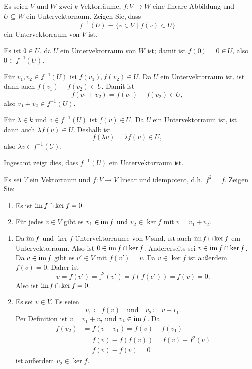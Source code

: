 \begin{question}
 Es seien $V$ und $W$ zwei $k$-Vektorräume, $f \colon V \to W$ eine lineare Abbildung und $U \subseteq W$ ein Untervektorraum. Zeigen Sie, dass
 \[
  f^{-1}(U) = \{v \in V \mid f(v) \in U\}
 \]
 ein Untervektorraum von $V$ ist.
\end{question}
\begin{solution}
 Es ist $0 \in U$, da $U$ ein Untervektorraum von $W$ ist; damit ist $f(0) = 0 \in U$, also $0 \in f^{-1}(U)$.
 
 Für $v_1, v_2 \in f^{-1}(U)$ ist $f(v_1), f(v_2) \in U$. Da $U$ ein Untervektorraum ist, ist dann auch $f(v_1) + f(v_2) \in U$. Damit ist
 \[
  f(v_1 + v_2) = f(v_1) + f(v_2) \in U,
 \]
 also $v_1 + v_2 \in f^{-1}(U)$.
 
 Für $\lambda \in k$ und $v \in f^{-1}(U)$ ist $f(v) \in U$. Da $U$ ein Untervektorraum ist, ist dann auch $\lambda f(v) \in U$. Deshalb ist
 \[
  f(\lambda v) = \lambda f(v) \in U,
 \]
 also $\lambda v \in f^{-1}(U)$.
 
 Ingesamt zeigt dies, dass $f^{-1}(U)$ ein Untervektorraum ist.
\end{solution}


\begin{question}
 Es sei $V$ ein Vektorraum und $f \colon V \to V$ linear und idempotent, d.h.\ $f^2 = f$. Zeigen Sie:
 \begin{enumerate}
  \item
   Es ist $\operatorname{im} f \cap \ker f = 0$.
  \item
   Für jedes $v \in V$ gibt es $v_1 \in \operatorname{im} f$ und $v_2 \in \ker f$ mit $v = v_1 + v_2$.
 \end{enumerate}
\end{question}
\begin{solution}
 \begin{enumerate}
  \item
   Da $\operatorname{im} f$ und $\ker f$ Untervektorräume von $V$ sind, ist auch $\operatorname{im} f \cap \ker f$ ein Untervektorraum. Also ist $0 \in \operatorname{im} f \cap \ker f$. Andererseits sei $v \in \operatorname{im} f \cap \ker f$. Da $v \in \operatorname{im} f$ gibt es $v' \in V$ mit $f(v') = v$. Da $v \in \ker f$ ist außerdem $f(v) = 0$. Daher ist
   \[
    v = f(v') = f^2(v') = f(f(v')) = f(v) = 0.
   \]
   Also ist $\operatorname{im} f \cap \ker f = 0$.
  \item
   Es sei $v \in V$. Es seien
   \[
    v_1 \coloneqq f(v) \quad \text{und} \quad v_2 \coloneqq v - v_1.
   \]
   Per Definition ist $v = v_1 + v_2$ und $v_1 \in \operatorname{im} f$. Da
   \begin{align*}
    f(v_2) &= f(v - v_1) = f(v) - f(v_1) \\
           &= f(v) - f(f(v)) = f(v) - f^2(v) \\
           &= f(v) - f(v) = 0
   \end{align*}
   ist außerdem $v_2 \in \ker f$.
 \end{enumerate}
\end{solution}


